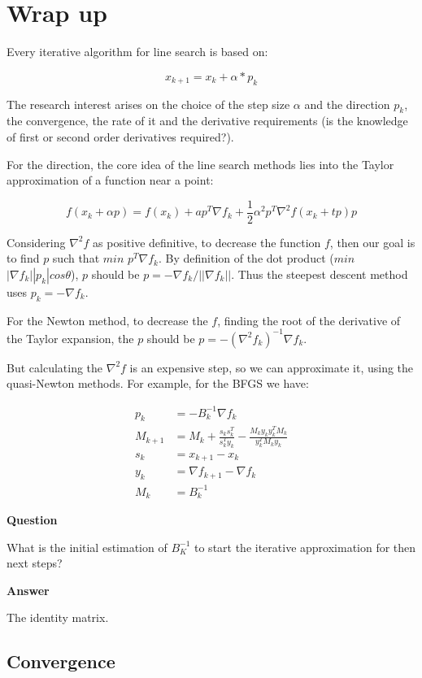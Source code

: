 \documentclass[a4paper,11pt]{article}
\numberwithin{equation}{section} %
\begin{document}
\section{Wrap up}

Every iterative algorithm for line search is based on:

\[x_{k+1} = x_k + \alpha*p_k\]

The research interest arises on the choice of the step size $\alpha$ and the direction $p_k$, the convergence, the rate of it and the derivative requirements (is the knowledge of first or second order derivatives required?).

For the direction,
the core idea of the line search methods lies into the Taylor approximation of a function near a point:

\[f(x_k + \alpha p) = f(x_k) + a p^T \nabla f_k + \frac{1}{2} \alpha^2 p^T \nabla^2 f(x_k + tp) p\]

Considering $\nabla^2 f$ as positive definitive, to decrease the function $f$, then our goal is to find $p$ such that
$min$ $p^T \nabla f_k$. By definition of the dot product ($min$ $|\nabla f_k| |p_k| cos \theta$), $p$ should be $p = - \nabla f_k / ||\nabla f_k||$. Thus the steepest descent method uses $p_k = - \nabla f_k$.

For the Newton method, to decrease the $f$, finding the root of the derivative of the Taylor expansion, the $p$ should be $p = - (\nabla^2 f_k) ^{-1} \nabla f_k$.

But calculating the $\nabla^2 f$ is an expensive step, so we can approximate it, using the quasi-Newton methods. For example, for the BFGS we have:

\begin{align}
    p_k &= -B_k^{-1} \nabla f_k \\
    M_{k+1} &= M_k + \frac{s_k s_k^T}{s_k^T y_k} - \frac{M_k y_k y_k^T M_k}{y_k^T M_k y_k} \\
    s_k &= x_{k+1} - x_k \\
    y_k &= \nabla f_{k+1} - \nabla f_k \\
    M_k &= B_k^{-1}
\end{align}

\textbf{Question}

What is the initial estimation of $B_K^{-1}$ to start the iterative approximation for then next steps?

\textbf{Answer}

The identity matrix.

\subsection{Convergence}
\end{document}
